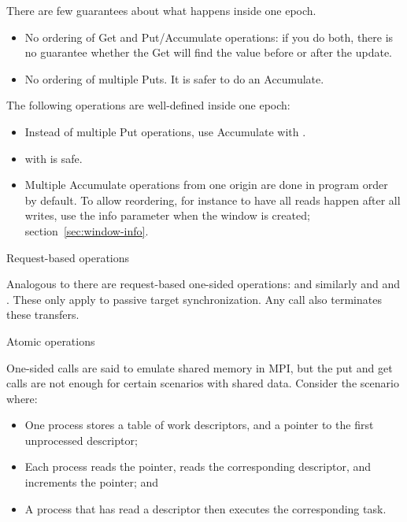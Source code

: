 There are few guarantees about what happens inside one epoch.
\begin{itemize}
\item No ordering of Get and Put/Accumulate operations: if you do
  both, there is no guarantee whether the Get will find the value
  before or after the update.
\item No ordering of multiple Puts. It is safer to do an Accumulate.
\end{itemize}
The following operations are well-defined inside one epoch:
\begin{itemize}
\item Instead of multiple Put operations, use Accumulate with
  .
\item {} with
   is safe.
\item Multiple Accumulate operations from one origin are done in
  program order by default. To allow reordering, for instance to have
  all reads happen after all writes, use the info parameter
  when the window is created; section~\ref{sec:window-info}.
\end{itemize}

 {Request-based operations}

Analogous to  there are request-based one-sided operations:
%
%
and similarly  and
and .
These only apply to passive target synchronization.
Any  call also terminates these transfers.

 {Atomic operations}
\label{sec:mpi-atomic}

One-sided calls are said to emulate shared memory in MPI, but 
the put and get calls are not enough for certain scenarios with shared
data. Consider the scenario where:

\begin{itemize}
\item One process stores a table of work descriptors, and a pointer to
  the first unprocessed descriptor;
\item Each process reads the pointer, reads the corresponding
  descriptor, and increments the pointer; and
\item A process that has read a descriptor then executes the
  corresponding task.
\end{itemize}

